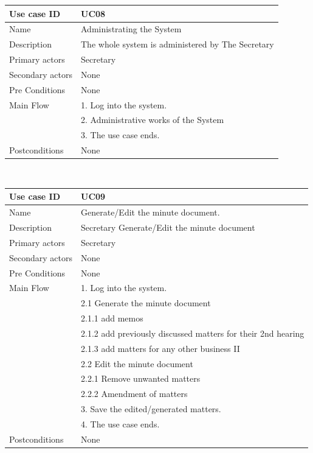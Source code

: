 \documentclass[a4paper,beamer]{article}
\begin{document}
			\begin{tabular}{|p{4cm}|p{8cm}|} \hline 
					\textbf{Use case ID} & \textbf{UC08}  \\ \hline
					Name & Administrating the System \\ \hline 
					Description & The whole system is administered by The Secretary \\ \hline 
					Primary actors & Secretary \\ \hline 
					Secondary actors & None \\ \hline 
					Pre Conditions & None \\ \hline
					Main Flow &	1. Log into the system.\\
										& 2. Administrative works of the System\\
										& 3. The use case ends.\\ \hline
					Postconditions & None \\ \hline 
			\end{tabular} \\[.6cm]
			
			\begin{tabular}{|p{4cm}|p{8cm}|} \hline 
					\textbf{Use case ID} & \textbf{UC09}  \\ \hline
					Name & Generate/Edit the minute document. \\ \hline 
					Description & Secretary Generate/Edit the minute document \\ \hline 
					Primary actors & Secretary \\ \hline 
					Secondary actors & None \\ \hline 
					Pre Conditions & None \\ \hline
					Main Flow &	1. Log into the system.\\
										& 2.1 Generate the minute document\\
										& 2.1.1 add memos\\
										& 2.1.2 add previously discussed matters for their 2nd hearing \\
										& 2.1.3 add matters for any other business II\\
										& 2.2 Edit the minute document \\
										& 2.2.1 Remove unwanted matters\\
										& 2.2.2 Amendment of matters\\
										& 3. Save the edited/generated  matters.\\
										& 4. The use case ends.\\ \hline
					Postconditions & None \\ \hline 
			\end{tabular} \\[.6cm]
			
\end{document}
